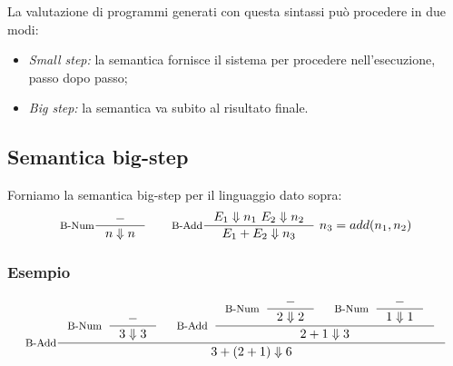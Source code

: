 \documentclass[a4paper, 11pt]{article}
\begin{document}
	La valutazione di programmi generati con questa sintassi può procedere in due modi:
	\begin{itemize}
		\item \textit{Small step:} la semantica fornisce il sistema per procedere nell'esecuzione, passo dopo passo;
		\item \textit{Big step:} la semantica va subito al risultato finale.
	\end{itemize}

	\subsection{Semantica big-step}
	Forniamo la semantica big-step per il linguaggio dato sopra:
	\begin{align*}
		\inference[B-Num]{-}{n \Downarrow n} \qquad \inference[B-Add]{E_1 \Downarrow n_1\ E_2 \Downarrow n_2}{E_1 + E_2 \Downarrow n_3}\ n_3 = add(n_1, n_2)
	\end{align*}
	
	\subsubsection{Esempio}
	\begin{align*}
		\inference[B-Add]{\inference[B-Num]{-}{3 \Downarrow 3} & \inference[B-Add]{\inference[B-Num]{-}{2 \Downarrow 2} & \inference[B-Num]{-}{1 \Downarrow 1}} {2 + 1 \Downarrow 3}}{3 + (2 + 1) \Downarrow 6}
	\end{align*}
	
\end{document}

